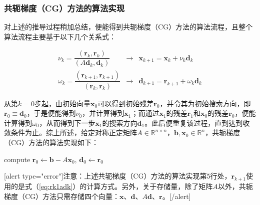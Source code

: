 \documentclass[UTF8,nofonts]{ctexart}
\begin{document}
\subsubsection*{共轭梯度（CG）方法的算法实现}

对上述的推导过程稍加总结，便能得到共轭梯度（CG）方法的算法流程，且整个算法流程主要基于以下几个关系式：

\begin{equation}
\renewcommand\arraystretch{1.5}
\begin{array}{lcl}
\nu_k=\dfrac{(\boldsymbol{r}_k,\boldsymbol{r}_k)}{(A\boldsymbol{d}_k,\boldsymbol{d}_k)} & \to & 
\boldsymbol{x}_{k+1}=\boldsymbol{x}_k+\nu_k\boldsymbol{d}_k \\
\omega_k=\dfrac{(\boldsymbol{r}_{k+1},\boldsymbol{r}_{k+1})}{(\boldsymbol{r}_k,\boldsymbol{r}_k)} & \to &
\boldsymbol{d}_{k+1}=\boldsymbol{r}_{k+1}+\omega_k\boldsymbol{d}_k
\end{array}
\end{equation}

从第$k=0$步起，由初始向量$\boldsymbol{x}_0$可以得到初始残差$\boldsymbol{r}_0$，并令其为初始搜索方向，即$\boldsymbol{r}_0\equiv\boldsymbol{d}_0$，于是便能得到$\nu_0$，并计算得到$\boldsymbol{x}_1$；而通过$\boldsymbol{x}_1$的残差$\boldsymbol{r}_1$和$\boldsymbol{x}_0$的残差$\boldsymbol{r}_0$，便能计算得到$\omega_0$，从而得到下一步$\boldsymbol{x}_1$的搜索方向$\boldsymbol{d}_1$。此后便重复该过程，直到达到收敛条件为止。综上所述，给定对称正定矩阵$A\in\mathbb{R}^{n \times n}$，$\boldsymbol{b},\boldsymbol{x}_0\in\mathbb{R}^n$，共轭梯度（CG）方法的算法实现如下：

\begin{algorithm}[H]
compute $\boldsymbol{r}_0\gets\boldsymbol{b}-A\boldsymbol{x}_0$, $\boldsymbol{d}_0\gets\boldsymbol{r}_0$\;
\end{algorithm}

[alert type="error"]注意：上述共轭梯度（CG）方法的算法实现第$5$行处，$\boldsymbol{r}_{k+1}$使用的是式（\ref{eq:rk1adk}）的计算方式。另外，关于存储量，除了矩阵$A$以外，共轭梯度（CG）方法只需存储四个向量：$\boldsymbol{x}$、$\boldsymbol{d}$、$A\boldsymbol{d}$、$\boldsymbol{r}$。[/alert]
\end{document}
